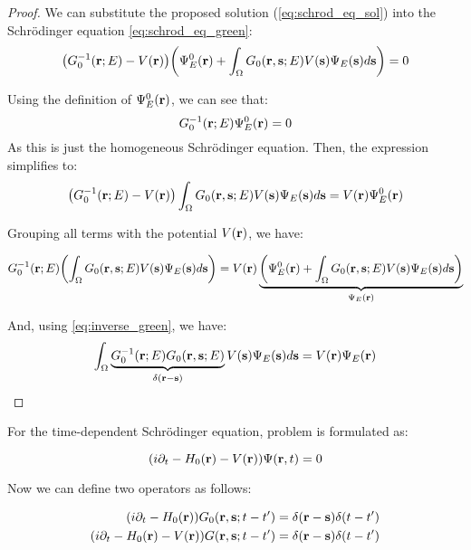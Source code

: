 \begin{proof}
    We can substitute the proposed solution (\cref{eq:schrod_eq_sol}) into the Schrödinger equation \cref{eq:schrod_eq_green}:
    \begin{equation}
        \qty(G_0^{-1}(\vb r;E)-V(\vb r))\qty(\Psi_E^0(\vb r)+\int_\Omega G_0(\vb r,\vb s;E)V(\vb s){\Psi_E(\vb s)}d\vb s)=0
    \end{equation}

    Using the definition of $\Psi_E^0(\vb r)$, we can see that:
    \[G_0^{-1}(\vb r;E)\Psi_E^0(\vb r)=0\]
    As this is just the homogeneous Schrödinger equation. Then, the expression simplifies to:
    \begin{equation}
        \qty(G_0^{-1}(\vb r;E)-V(\vb r))\int_\Omega G_0(\vb r,\vb s;E)V(\vb s){\Psi_E(\vb s)}d\vb s=V(\vb r)\Psi_E^0(\vb r)
    \end{equation}

    Grouping all terms with the potential $V(\vb r)$, we have:

    \begin{equation}
        G_0^{-1}(\vb r;E)\qty(\int_\Omega G_0(\vb r,\vb s; E)V(\vb s)\Psi_E(\vb s)d\vb s)=V(\vb r)\underbrace{\qty(\Psi_E^0(\vb r)+\int_\Omega G_0(\vb r,\vb s; E)V(\vb s)\Psi_E(\vb s)d\vb s)}_{\Psi_E(\vb r)}
    \end{equation}

    And, using \cref{eq:inverse_green}, we have:
    \begin{equation}
        \int_\Omega \underbrace{G_0^{-1}(\vb r; E)G_0(\vb r,\vb s; E)}_{\delta(\vb r-\vb s)}V(\vb s)\Psi_E(\vb s)d\vb s=V(\vb r)\Psi_E(\vb r)\qedhere
    \end{equation}
\end{proof}

For the time-dependent Schrödinger equation, problem is formulated as:

\begin{equation}\label{eq:td_schrod_eq}
    \qty(i\partial_t-H_0(\vb r)-V(\vb r)){\Psi(\vb r,t)}=0
\end{equation}

Now we can define two operators as follows:

\begin{subequations}
    \begin{align}
        \qty(i\partial_t-H_0(\vb r))G_0(\vb r,\vb s;t-t')&=\delta(\vb r-\vb s)\delta(t-t')
        \\
        \qty(i\partial_t-H_0(\vb r)-V(\vb r))G(\vb r,\vb s;t-t')&=\delta(\vb r-\vb s)\delta(t-t')
    \end{align}
\end{subequations}

